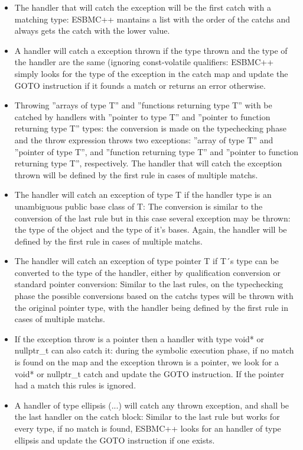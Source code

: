 \documentclass[a4paper]{llncs}
\begin{document}
\begin{itemize}
 \item The handler that will catch the exception will be the first catch with a matching type: ESBMC++ mantains a list with the order of
       the catchs and always gets the catch with the lower value.
 \item A handler will catch a exception thrown if the type thrown and the type of the handler are the same (ignoring const-volatile
       qualifiers: ESBMC++ simply looks for the type of the exception in the catch map and update the GOTO instruction if it founds a 
       match or returns an error otherwise.
 \item Throwing ''arrays of type T'' and ''functions returning type T'' with be catched by handlers with ''pointer to type T'' and 
       ''pointer to function returning type T'' types: the conversion is made on the typechecking phase and the throw expression throws 
       two exceptions: ''array of type T'' and ''pointer of type T'', and ''function returning type T'' and ''pointer to function returning 
       type T'', respectively. The handler that will catch the exception thrown will be defined by the first rule in cases of multiple
       matchs.
 \item The handler will catch an exception of type T if the handler type is an unambiguous public base class of T: The conversion is similar
       to the conversion of the last rule but in this case several exception may be thrown: the type of the object and the type of it's 
       bases. Again, the handler will be defined by the first rule in cases of multiple matchs.
 \item The handler will catch an exception of type pointer T if T´s type can be converted to the type of the handler, either by 
       qualification conversion or standard pointer conversion: Similar to the last rules, on the typechecking phase the possible 
       conversions based on the catchs types will be thrown with the original pointer type, with the handler being defined by the first rule
       in cases of multiple matchs.
 \item If the exception throw is a pointer then a handler with type void* or nullptr\_t can also catch it: during the symbolic execution
       phase, if no match is found on the map and the exception thrown is a pointer, we look for a void* or nullptr\_t catch and update the
       GOTO instruction. If the pointer had a match this rules is ignored.
 \item A handler of type ellipsis (...) will catch any thrown exception, and shall be the last handler on the catch block: Similar to the 
       last rule but works for every type, if no match is found, ESBMC++ looks for an handler of type ellipsis and update the GOTO 
       instruction if one exists.
\end{itemize}
\end{document}
